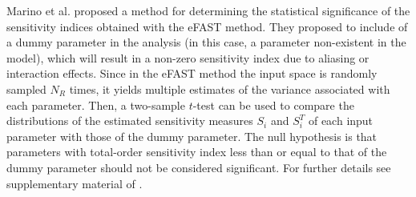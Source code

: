 \documentclass[12pt]{article}
\begin{document}
{Marino et al. \cite{MARINO} proposed a method for determining the statistical significance of the sensitivity indices obtained with the eFAST method. They proposed to include of a dummy parameter in the analysis (in this case, a parameter non-existent in the model), which will result in a non-zero sensitivity index due to aliasing or interaction effects. Since in the eFAST method the input space is randomly sampled $N_{R}$ times, it yields multiple estimates of the variance associated with each parameter. Then, a two-sample $t$-test can be used to compare the distributions of the estimated sensitivity measures $S_{i}$ and $S^{T}_{i}$ of each input parameter with those of the dummy parameter. The null hypothesis is that parameters with total-order sensitivity index less than or equal to that of the dummy parameter should not be considered significant. For further details see supplementary material of \cite{MARINO}.






}
\end{document}
